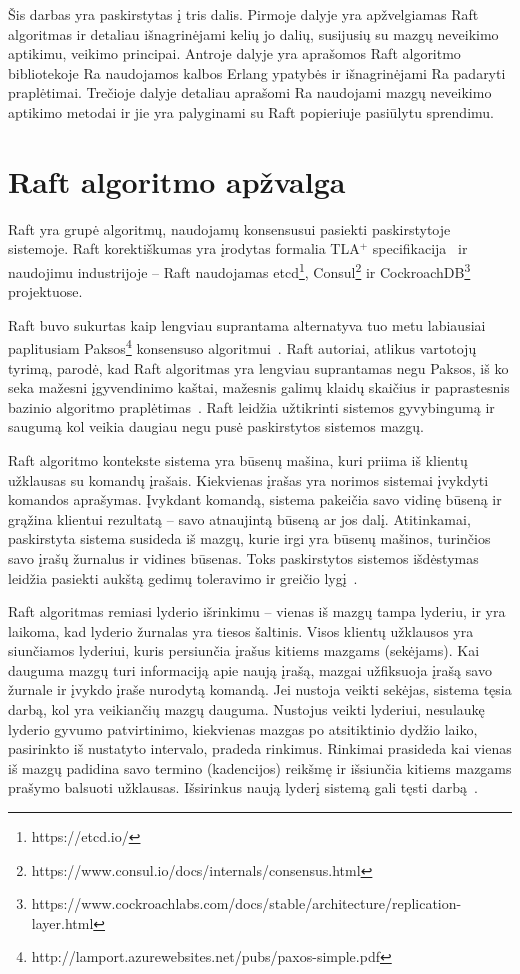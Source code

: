 \documentclass{VUMIFPSkursinis}
\newcommand{\TD}[1]{\todo[inline, color=red!40]{#1}}
\begin{document}
\TD{tai kiek dalių lieka - 2/3?}
Šis darbas yra paskirstytas į tris dalis. Pirmoje dalyje yra apžvelgiamas Raft algoritmas ir detaliau išnagrinėjami kelių jo dalių, susijusių su mazgų neveikimo aptikimu, veikimo principai. Antroje dalyje yra aprašomos Raft algoritmo bibliotekoje Ra naudojamos kalbos Erlang ypatybės ir išnagrinėjami Ra padaryti praplėtimai. Trečioje dalyje detaliau aprašomi Ra naudojami mazgų neveikimo aptikimo metodai ir jie yra palyginami su Raft popieriuje pasiūlytu sprendimu.

\section{Raft algoritmo apžvalga}

Raft yra grupė algoritmų, naudojamų konsensusui pasiekti paskirstytoje sistemoje. Raft korektiškumas yra įrodytas formalia TLA$^+$ specifikacija~\cite{ongaro_consensus} ir naudojimu industrijoje -- Raft naudojamas etcd\footnote{https://etcd.io/}, Consul\footnote{https://www.consul.io/docs/internals/consensus.html} ir CockroachDB\footnote{https://www.cockroachlabs.com/docs/stable/architecture/replication-layer.html} projektuose. 

Raft buvo sukurtas kaip lengviau suprantama alternatyva tuo metu labiausiai paplitusiam Paksos\footnote{http://lamport.azurewebsites.net/pubs/paxos-simple.pdf} konsensuso algoritmui~\cite{ongaro_consensus, diego_designing_2016}. Raft autoriai, atlikus vartotojų tyrimą, parodė, kad Raft algoritmas yra lengviau suprantamas negu Paksos, iš ko seka mažesni įgyvendinimo kaštai, mažesnis galimų klaidų skaičius ir paprastesnis bazinio algoritmo praplėtimas~\cite{ongaro_consensus}. Raft leidžia užtikrinti sistemos gyvybingumą ir saugumą kol veikia daugiau negu pusė paskirstytos sistemos mazgų. 

Raft algoritmo kontekste sistema yra būsenų mašina, kuri priima iš klientų užklausas su komandų įrašais. Kiekvienas įrašas yra norimos sistemai įvykdyti komandos aprašymas. Įvykdant komandą, sistema pakeičia savo vidinę būseną ir grąžina klientui rezultatą -- savo atnaujintą būseną ar jos dalį. Atitinkamai, paskirstyta sistema susideda iš mazgų, kurie irgi yra būsenų mašinos, turinčios savo įrašų žurnalus ir vidines būsenas. Toks paskirstytos sistemos išdėstymas leidžia pasiekti aukštą gedimų toleravimo ir greičio lygį~\cite{ongaro_consensus, steen_distributed_2017}.

Raft algoritmas remiasi lyderio išrinkimu -- vienas iš mazgų tampa lyderiu, ir yra laikoma, kad lyderio žurnalas yra tiesos šaltinis. Visos klientų užklausos yra siunčiamos lyderiui, kuris persiunčia įrašus kitiems mazgams (sekėjams). Kai dauguma mazgų turi informaciją apie naują įrašą, mazgai užfiksuoja įrašą savo žurnale ir įvykdo įraše nurodytą komandą. Jei nustoja veikti sekėjas, sistema tęsia darbą, kol yra veikiančių mazgų dauguma. Nustojus veikti lyderiui, nesulaukę lyderio gyvumo patvirtinimo, kiekvienas mazgas po atsitiktinio dydžio laiko, pasirinkto iš nustatyto intervalo,  pradeda rinkimus. Rinkimai prasideda kai vienas iš mazgų padidina savo termino (kadencijos) reikšmę ir išsiunčia kitiems mazgams prašymo balsuoti užklausas. Išsirinkus naują lyderį sistemą gali tęsti darbą~\cite{ongaro_consensus}. 
\end{document}
